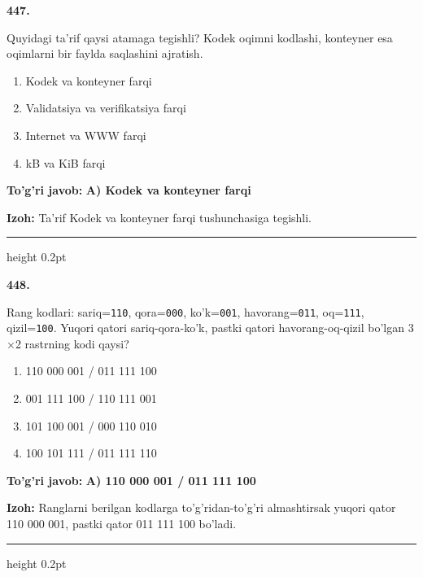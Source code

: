 \documentclass[10pt,a4paper,oneside]{article}
\begin{document}
\noindent\textbf{\color{ink}447.}
\par
Quyidagi ta'rif qaysi atamaga tegishli? Kodek oqimni kodlashi, konteyner esa oqimlarni bir faylda saqlashini ajratish.
\begin{enumerate}[label=\Alph*),leftmargin=9mm]
\item Kodek va konteyner farqi
\item Validatsiya va verifikatsiya farqi
\item Internet va WWW farqi
\item kB va KiB farqi
\end{enumerate}
\begin{tcolorbox}[enhanced,breakable,colback=teal!4,colframe=teal!50!black,boxrule=0.5pt,arc=1.1mm,left=3mm,right=3mm,top=1.7mm,bottom=1.7mm,before skip=2mm,after skip=2mm]
\textbf{\color{teal}To'g'ri javob:} \textbf{A) Kodek va konteyner farqi}
\par\smallskip
\textbf{Izoh:} Ta'rif Kodek va konteyner farqi tushunchasiga tegishli.
\end{tcolorbox}
\vspace{2mm}\hrule height 0.2pt \vspace{3mm}

\noindent\textbf{\color{ink}448.}
\par
Rang kodlari: sariq=\texttt{110}, qora=\texttt{000}, ko'k=\texttt{001}, havorang=\texttt{011}, oq=\texttt{111}, qizil=\texttt{100}. Yuqori qatori sariq-qora-ko'k, pastki qatori havorang-oq-qizil bo'lgan 3\ensuremath{\times}2 rastrning kodi qaysi?
\begin{enumerate}[label=\Alph*),leftmargin=9mm]
\item 110 000 001 / 011 111 100
\item 001 111 100 / 110 111 001
\item 101 100 001 / 000 110 010
\item 100 101 111 / 011 111 110
\end{enumerate}
\begin{tcolorbox}[enhanced,breakable,colback=teal!4,colframe=teal!50!black,boxrule=0.5pt,arc=1.1mm,left=3mm,right=3mm,top=1.7mm,bottom=1.7mm,before skip=2mm,after skip=2mm]
\textbf{\color{teal}To'g'ri javob:} \textbf{A) 110 000 001 / 011 111 100}
\par\smallskip
\textbf{Izoh:} Ranglarni berilgan kodlarga to'g'ridan-to'g'ri almashtirsak yuqori qator 110 000 001, pastki qator 011 111 100 bo'ladi.
\end{tcolorbox}
\vspace{2mm}\hrule height 0.2pt \vspace{3mm}
\end{document}
